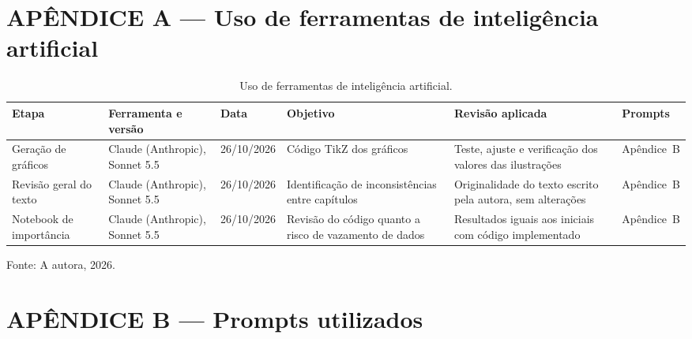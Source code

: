
{}
\chapter*{APÊNDICE A — Uso de ferramentas de inteligência artificial}

\begin{table}[htbp]
	\centering
	\footnotesize
	\begin{tabularx}{\textwidth}{p{2.2cm} p{2.2cm} p{1.6cm} X X p{1.3cm}}
		\toprule
		\textbf{Etapa} & \textbf{Ferramenta e versão} & \textbf{Data} & \textbf{Objetivo} & \textbf{Revisão aplicada} & \textbf{Prompts} \\
		\midrule
		Geração de gráficos & Claude (Anthropic), Sonnet 5.5 & 26/10/2026 & Código TikZ dos gráficos & Teste, ajuste e verificação dos valores das ilustrações & Apêndice~B \\
		\midrule
		Revisão geral do texto & Claude (Anthropic), Sonnet 5.5 & 26/10/2026 & Identificação de inconsistências entre capítulos & Originalidade do texto escrito pela autora, sem alterações & Apêndice~B \\
		\midrule
		Notebook de importância & Claude (Anthropic), Sonnet 5.5 & 26/10/2026 & Revisão do código quanto a risco de vazamento de dados & Resultados iguais aos iniciais com código implementado & Apêndice~B \\
		\bottomrule
	\end{tabularx}
	\caption{Uso de ferramentas de inteligência artificial.}
	\vspace{4pt}
	{\footnotesize \centering Fonte: A autora, 2026.\par}
\end{table}

\clearpage

{}
\chapter*{APÊNDICE B — Prompts utilizados}

